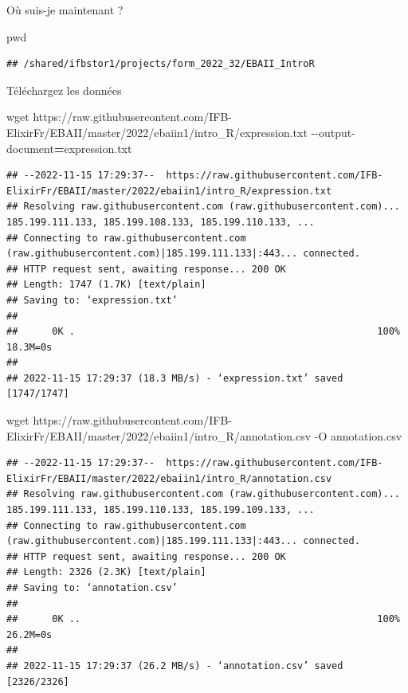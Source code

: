 \documentclass[
]{book}
\newenvironment{Shaded}{\begin{snugshade}}{\end{snugshade}}
\newcommand{\AttributeTok}[1]{\textcolor[rgb]{0.77,0.63,0.00}{#1}}
\newcommand{\BuiltInTok}[1]{#1}
\newcommand{\FunctionTok}[1]{\textcolor[rgb]{0.00,0.00,0.00}{#1}}
\newcommand{\NormalTok}[1]{#1}
\newcommand{\OperatorTok}[1]{\textcolor[rgb]{0.81,0.36,0.00}{\textbf{#1}}}
\begin{document}
Où suis-je maintenant ?

\begin{Shaded}
\begin{Highlighting}[]
\BuiltInTok{pwd}
\end{Highlighting}
\end{Shaded}

\begin{verbatim}
## /shared/ifbstor1/projects/form_2022_32/EBAII_IntroR
\end{verbatim}

Téléchargez les données

\begin{Shaded}
\begin{Highlighting}[]
\FunctionTok{wget}\NormalTok{ https://raw.githubusercontent.com/IFB{-}ElixirFr/EBAII/master/2022/ebaiin1/intro\_R/expression.txt }\AttributeTok{{-}{-}output{-}document}\OperatorTok{=}\NormalTok{expression.txt}
\end{Highlighting}
\end{Shaded}

\begin{verbatim}
## --2022-11-15 17:29:37--  https://raw.githubusercontent.com/IFB-ElixirFr/EBAII/master/2022/ebaiin1/intro_R/expression.txt
## Resolving raw.githubusercontent.com (raw.githubusercontent.com)... 185.199.111.133, 185.199.108.133, 185.199.110.133, ...
## Connecting to raw.githubusercontent.com (raw.githubusercontent.com)|185.199.111.133|:443... connected.
## HTTP request sent, awaiting response... 200 OK
## Length: 1747 (1.7K) [text/plain]
## Saving to: ‘expression.txt’
## 
##      0K .                                                     100% 18.3M=0s
## 
## 2022-11-15 17:29:37 (18.3 MB/s) - ‘expression.txt’ saved [1747/1747]
\end{verbatim}

\begin{Shaded}
\begin{Highlighting}[]
\FunctionTok{wget}\NormalTok{ https://raw.githubusercontent.com/IFB{-}ElixirFr/EBAII/master/2022/ebaiin1/intro\_R/annotation.csv }\AttributeTok{{-}O}\NormalTok{ annotation.csv}
\end{Highlighting}
\end{Shaded}

\begin{verbatim}
## --2022-11-15 17:29:37--  https://raw.githubusercontent.com/IFB-ElixirFr/EBAII/master/2022/ebaiin1/intro_R/annotation.csv
## Resolving raw.githubusercontent.com (raw.githubusercontent.com)... 185.199.111.133, 185.199.110.133, 185.199.109.133, ...
## Connecting to raw.githubusercontent.com (raw.githubusercontent.com)|185.199.111.133|:443... connected.
## HTTP request sent, awaiting response... 200 OK
## Length: 2326 (2.3K) [text/plain]
## Saving to: ‘annotation.csv’
## 
##      0K ..                                                    100% 26.2M=0s
## 
## 2022-11-15 17:29:37 (26.2 MB/s) - ‘annotation.csv’ saved [2326/2326]
\end{verbatim}
\end{document}
